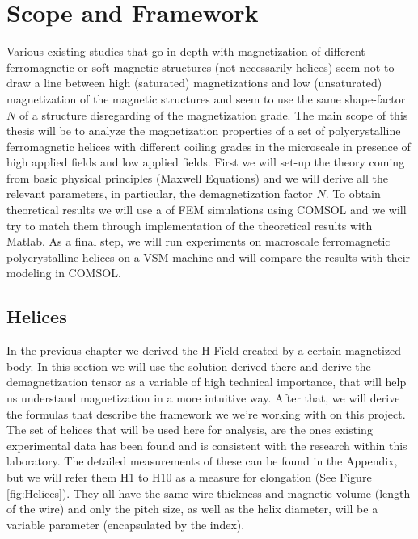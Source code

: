 
\section{Scope and Framework}

Various existing studies that go in depth with magnetization of different ferromagnetic or soft-magnetic structures (not necessarily helices) seem not to draw a line between high (saturated) magnetizations and low (unsaturated) magnetization of the magnetic structures and seem to use the same shape-factor $N$ of a structure disregarding of the magnetization grade. The main scope of this thesis will be to analyze the magnetization properties of a set of polycrystalline ferromagnetic helices with different coiling grades in the microscale in presence of high applied fields and low applied fields. First we will set-up the theory coming from basic physical principles (Maxwell Equations) and we will derive all the relevant parameters, in particular, the demagnetization factor $N$. To obtain theoretical results we will use a of FEM simulations using COMSOL and we will try to match them through implementation of the theoretical results with Matlab. As a final step, we will run experiments on macroscale ferromagnetic polycrystalline helices on a VSM machine and will compare the results with their modeling in COMSOL. 

\subsection{Helices}

In the previous chapter we derived the H-Field created by a certain magnetized body. In this section we will use the solution derived there and derive the demagnetization tensor as a variable of high technical importance, that will help us understand magnetization in a more intuitive way. After that, we will derive the formulas that describe the framework we we're working with on this project.\\

The set of helices that will be used here for analysis, are the ones existing experimental data has been found and is consistent with the research within this laboratory. The detailed measurements of these can be found in the Appendix, but we will refer them H1 to H10 as a measure for elongation (See Figure \ref{fig:Helices}). They all have the same wire thickness and magnetic volume (length of the wire) and only the pitch size, as well as the helix diameter, will be a variable parameter (encapsulated by the index).

